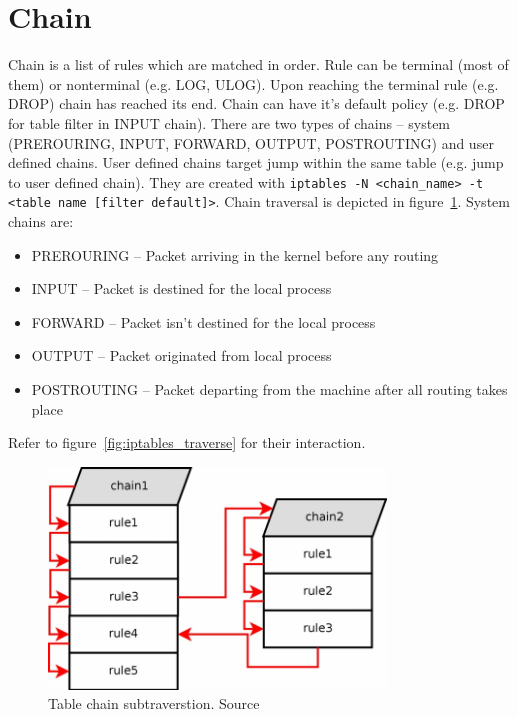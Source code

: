 \documentclass[times, utf8, seminar, english]{fer}
\begin{document}
\section{Chain}
    Chain is a list of rules which are matched in order. Rule can be terminal (most of them) or nonterminal (e.g. LOG,  ULOG). Upon reaching the terminal rule (e.g. DROP) chain has reached its end. Chain can have it's default policy (e.g. DROP for table filter in INPUT chain).
    There are two types of chains -- system (PREROURING, INPUT, FORWARD, OUTPUT, POSTROUTING) and user defined chains.
    User defined chains target jump within the same table (e.g. jump to user defined chain).
    They are created with \verb|iptables -N <chain_name> -t <table name [filter default]>|.
    Chain traversal is depicted in figure~\ref{fig:iptables_subtraverse}. System chains are:

    \begin{itemize}
        \item PREROURING -- Packet arriving in the kernel before any routing
        \item INPUT -- Packet is destined for the local process
        \item FORWARD -- Packet isn't destined for the local process
        \item OUTPUT -- Packet originated from local process
        \item POSTROUTING -- Packet departing from the machine after all routing takes place
    \end{itemize}
    Refer to figure~\ref{fig:iptables_traverse} for their interaction.

    \begin{figure}
        \centering
        \includegraphics[width=0.8\textwidth]{table_subtraverse}
        \caption{Table chain subtraverstion. Source~\cite{Iptables99:online}}
        \label{fig:iptables_subtraverse}
    \end{figure}
\end{document}
